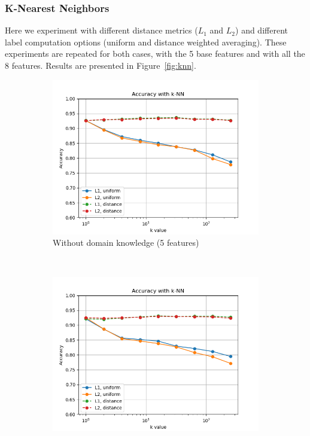 \documentclass{article}
\begin{document}
\subsubsection{K-Nearest Neighbors}
Here we experiment with different distance metrics ($L_1$ and $L_2$) and different label computation options (uniform and distance weighted averaging). These experiments are repeated for both cases, with the 5 base features and with all the 8 features. Results are presented in Figure~\ref{fig:knn}.

\begin{figure}[h!]
    \centering
    \begin{subfigure}[b]{0.45\textwidth}
        \includegraphics[width=\textwidth]{figures/wo_domain_knowledge/accuracy_knn.png}
        \caption{Without domain knowledge (5  features)}
        \label{fig:gull}
    \end{subfigure}
    ~ %
    \begin{subfigure}[b]{0.45\textwidth}
        \includegraphics[width=\textwidth]{figures/w_domain_knowledge/accuracy_knn.png}

\end{subfigure}
\end{figure}
\end{document}

